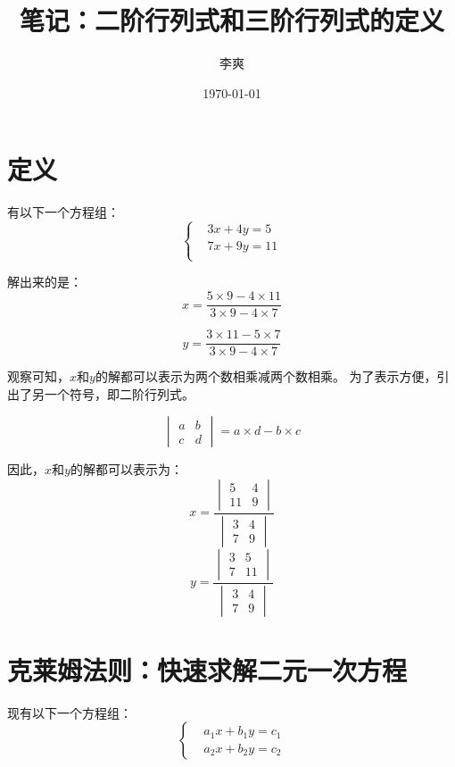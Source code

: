 \documentclass[UTF8, 12pt]{article} %
\title{笔记：二阶行列式和三阶行列式的定义}
\author{李爽}
\date{\today}
\begin{document}
\maketitle

\section{定义}
有以下一个方程组：
\begin{equation*}
\left\{
    \begin{aligned}
        &3x + 4y = 5 \\
        &7x + 9y = 11 \\
    \end{aligned}
\right.
\end{equation*}


解出来的是：
$$
x=\frac{5\times9-4\times11}{3\times9-4\times7}
$$

$$
y=\frac{3\times11-5\times7}{3\times9-4\times7}
$$


观察可知，$x$和$y$的解都可以表示为两个数相乘减两个数相乘。
为了表示方便，引出了另一个符号，即二阶行列式。


$$
\begin{vmatrix}
    a & b \\
    c & d
\end{vmatrix}
=a \times d - b \times c
$$


因此，$x$和$y$的解都可以表示为：
$$
x=\frac{\begin{vmatrix}
    5 & 4 \\
    11 & 9
\end{vmatrix}}{\begin{vmatrix}
    3 & 4 \\
    7 & 9
\end{vmatrix}}
$$
$$
y=\frac{\begin{vmatrix}
    3 & 5 \\
    7 & 11
\end{vmatrix}}{\begin{vmatrix}
    3 & 4 \\
    7 & 9
\end{vmatrix}}
$$


\section{克莱姆法则：快速求解二元一次方程}
现有以下一个方程组：
$$
\left\{
    \begin{aligned}
    &a_1 x + b_1 y=c_1\\
    &a_2 x + b_2 y=c_2
    \end{aligned}
\right.
$$
\end{document}
